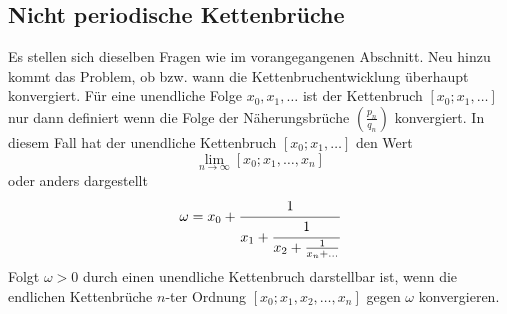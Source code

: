 \subsection{Nicht periodische Kettenbrüche}
Es stellen sich dieselben Fragen wie im vorangegangenen Abschnitt.
Neu hinzu kommt das Problem, ob bzw. wann die Kettenbruchentwicklung
überhaupt konvergiert.
Für eine unendliche Folge $x_0,x_1,\dots$ ist der Kettenbruch
$[x_0;x_1,\dots]$ nur dann definiert wenn die Folge der Näherungsbrüche
$(\frac{p_n}{q_n})$ konvergiert. In diesem Fall hat der unendliche
Kettenbruch $[x_0;x_1,\dots]$ den Wert
\begin{equation}
\lim_{n\to\infty} [x_0;x_1,\dots,x_n]
\end{equation}
oder anders dargestellt
\begin{equation}
\omega
=
x_0 + \cfrac{1}{x_1+\cfrac{1}{x_2+\frac{1}{x_n+\dots}}}
\end{equation}
Folgt $\omega > 0$ durch einen unendliche Kettenbruch darstellbar
ist, wenn die endlichen Kettenbrüche $n$-ter Ordnung
$[x_0;x_1,x_2,\dots,x_n]$ gegen $\omega$ konvergieren.

